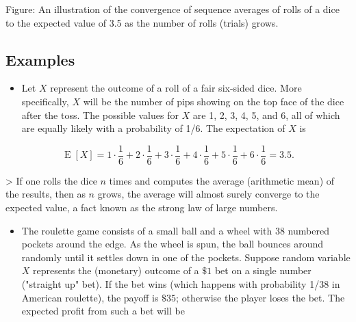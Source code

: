 


Figure: An illustration of the convergence of sequence averages of rolls of a dice to the
expected value of 3.5 as the number of rolls (trials) grows.




\subsection{Examples}
\label{sss:exam-bfeb}




\begin{itemize}
    \item Let $X$ represent the outcome of a roll of a fair six-sided dice. More specifically, $X$ will be the number of pips showing on the top face of the dice after the toss. The possible values for $X$ are 1, 2, 3, 4, 5, and 6, all of which are equally likely with a probability of 1/6. The expectation of $X$ is
\end{itemize}

$$\operatorname{E}[X] = 1\cdot\frac16 + 2\cdot\frac16 + 3\cdot\frac16 + 4\cdot\frac16 + 5\cdot\frac16 + 6\cdot\frac16 = 3.5.$$



> If one rolls the dice $n$ times and computes the average (arithmetic mean) of the
results, then as $n$ grows, the average will almost surely converge to the expected value,
a fact known as the strong law of large numbers.



\begin{itemize}
    \item The roulette game consists of a small ball and a wheel with 38 numbered pockets around the edge. As the wheel is spun, the ball bounces around randomly until it settles down in one of the pockets. Suppose random variable $X$ represents the (monetary) outcome of a $ \$1 $ bet on a single number ("straight up" bet). If the bet wins (which happens with probability 1/38 in American roulette), the payoff is $ \$ 35 $; otherwise the player loses the bet. The expected profit from such a bet will be
\end{itemize}

